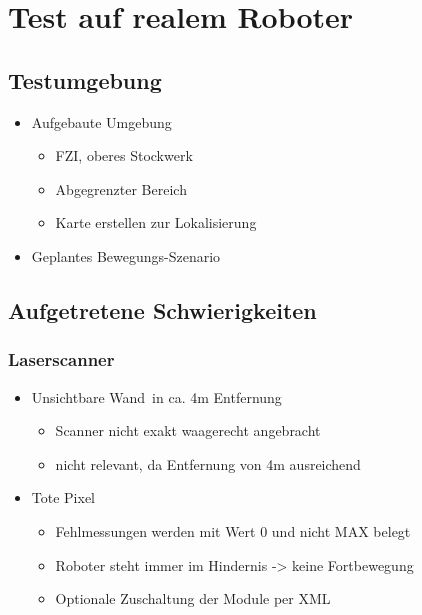 
\chapter{Test auf realem Roboter}
\authorsection{\editorjulian , \editortobias}

\section{Testumgebung}

\begin{itemize}
	\item Aufgebaute Umgebung
	\begin{itemize}
		\item FZI, oberes Stockwerk
		\item Abgegrenzter Bereich
		\item Karte erstellen zur Lokalisierung
	\end{itemize}
	\item Geplantes Bewegungs-Szenario
\end{itemize}


\section{Aufgetretene Schwierigkeiten}

\subsection{Laserscanner}

\begin{itemize}
	\item \glqq Unsichtbare Wand\grqq\ in ca. 4m Entfernung
	\begin{itemize}
		\item Scanner nicht exakt waagerecht angebracht
		\item nicht relevant, da Entfernung von 4m ausreichend
	\end{itemize}
	\item \glqq Tote Pixel\grqq
	\begin{itemize}
		\item Fehlmessungen werden mit Wert 0 und nicht MAX belegt
		\item Roboter steht immer im Hindernis -> keine Fortbewegung
		\item Optionale Zuschaltung der Module per XML
	\end{itemize}
\end{itemize}


